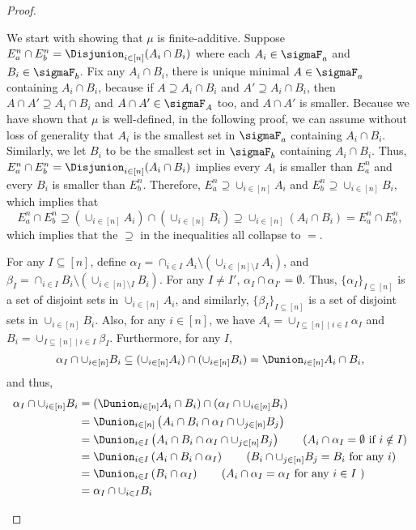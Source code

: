 \begin{proof}
\begin{itemize}
   We start with showing that $\mu$ is finite-additive.
   Suppose $E_a^n \cap E_b^n = \Disjunion_{i \in [n]}(A_i \cap B_i)$ where
   each $A_i \in \sigmaF_a$ and $B_i \in \sigmaF_b$.
  Fix any $A_i \cap B_i$, there is unique minimal $A \in \sigmaF_a$ containing
  $A_i \cap B_i$, because if $A \supseteq A_i \cap B_i$ and  $A' \supseteq
  A_i \cap B_i$, then  $A \cap A' \supseteq A_i \cap B_i$
  and $A \cap A' \in \sigmaF_A$ too, and $A \cap A'$ is smaller.
   Because we have shown that $\mu$ is well-defined, in the following proof,
   we can assume without loss of generality that $A_i$ is the smallest set in $\sigmaF_a$ containing $A_i \cap B_i$.
   Similarly, we let $B_i$ to be the smallest set in $\sigmaF_b$ containing $A_i \cap B_i$.
   Thus,  $E_a^n \cap E_b^n = \Disjunion_{i \in [n]}(A_i \cap B_i)$ implies
   every $A_i$ is smaller than $E_a^n$ and every $B_i$ is smaller than $E_b^n$.
   Therefore,
   $E_a^n \supseteq \cup_{i \in [n]} A_i$ and
   $E_b^n \supseteq \cup_{i \in [n]} B_i$,
   which implies that
   \[
    E_a^n \cap E_b^n \supseteq (\cup_{i \in [n]} A_i) \cap (\cup_{i \in [n]} B_i) \supseteq \cup_{i \in [n] } (A_i \cap B_i) = E_a^n \cap E_b^n,
   \]
   which implies that the $\supseteq$ in the inequalities all collapse to $=$.




   For any $I \subseteq [n]$, define
   $\alpha_I = \cap_{i \in I} A_i \setminus (\cup_{i \in [n] \setminus I} A_i)$, and $\beta_I = \cap_{i \in I} B_i \setminus (\cup_{i \in [n] \setminus I} B_i)$.
   For any $I \neq I'$, $\alpha_I \cap \alpha_{I'} = \emptyset$.
   Thus, $\{\alpha_I\}_{I \subseteq [n]}$ is a set of disjoint sets in $\cup_{i \in [n]} A_i$,
   and similarly, $\{\beta_I\}_{I \subseteq [n]}$ is a set of disjoint sets in $\cup_{i \in [n]} B_i$.
   Also, for any $i \in [n]$,
   we have
   $A_i = \cup_{I \subseteq [n] \mid i \in I} \alpha_I $
   and
   $B_i = \cup_{I \subseteq [n] \mid i \in I} \beta_I $.
   Furthermore, for any $I$,
\begin{align*}
    \alpha_I \cap \cup_{i \in [n]} B_i
    \subseteq (\cup_{i \in [n]} A_i) \cap (\cup_{i \in [n]} B_i)
    = \Dunion_{i \in [n]} A_i \cap B_i ,
   \end{align*}
and thus,
\begin{align}
    \alpha_I \cap \cup_{i \in [n]} B_i
    & = (\Dunion_{i \in [n]} A_i \cap B_i) \cap (\alpha_I \cap \cup_{i \in [n]} B_i) \notag \\
    & = \Dunion_{i \in [n]} \left( A_i \cap B_i \cap \alpha_I \cap \cup_{j \in [n]} B_j \right) \notag \\
    & = \Dunion_{i \in I} \left( A_i \cap B_i \cap \alpha_I \cap \cup_{j \in [n]} B_j \right)  \tag{$A_i \cap \alpha_I = \emptyset$ if $i \notin I$} \\
    & = \Dunion_{i \in I} \left( A_i \cap B_i \cap \alpha_I\right)
    \tag{$B_i \cap \cup_{j \in [n]} B_j = B_i$ for any $i$}\\
    & = \Dunion_{i \in I} \left( B_i \cap \alpha_I\right)
    \tag{$A_i \cap \alpha_I = \alpha_I$ for any $i \in I$ }\\
    & = \alpha_I \cap \cup_{i \in I } B_i
    \label{eq:finite-add-alpha}
   \end{align}


\end{itemize}
\end{proof}
